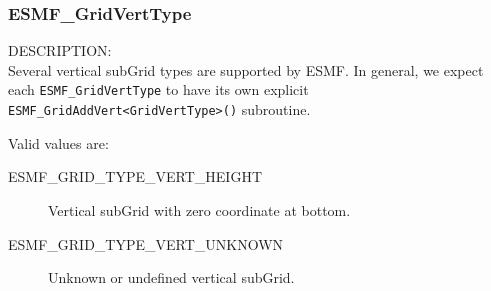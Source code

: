  \subsubsection{ESMF\_GridVertType}
 
 {\sf DESCRIPTION:\\}
 Several vertical subGrid types are supported by ESMF.  In general, we expect
 each {\tt ESMF\_GridVertType} to have its own explicit
 {\tt ESMF\_GridAddVert<GridVertType>()} subroutine.
 
 Valid values are:
 \begin{description}
    \item [ESMF\_GRID\_TYPE\_VERT\_HEIGHT]
          Vertical subGrid with zero coordinate at bottom.
    \item [ESMF\_GRID\_TYPE\_VERT\_UNKNOWN]
          Unknown or undefined vertical subGrid.

 \end{description}

%
%


